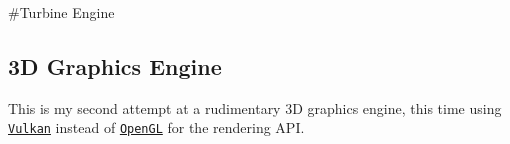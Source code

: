 \#\+Turbine Engine

\subsection*{3D Graphics Engine}

This is my second attempt at a rudimentary 3D graphics engine, this time using \href{https://www.khronos.org/vulkan/}{\tt Vulkan} instead of \href{https://www.opengl.org/}{\tt Open\+GL} for the rendering A\+PI. 